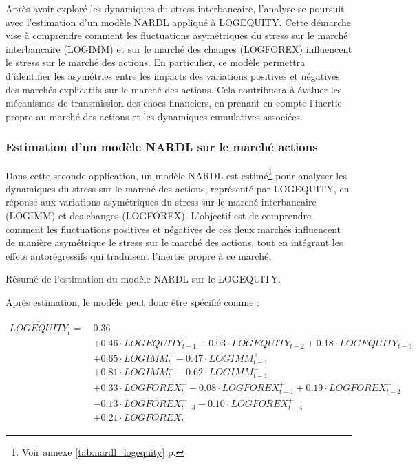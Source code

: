 Après avoir exploré les dynamiques du stress interbancaire, l'analyse se poursuit avec l'estimation d'un modèle NARDL appliqué à LOGEQUITY. Cette démarche vise à comprendre comment les fluctuations asymétriques du stress sur le marché interbancaire (LOGIMM) et sur le marché des changes (LOGFOREX) influencent le stress sur le marché des actions. En particulier, ce modèle permettra d'identifier les asymétries entre les impacts des variations positives et négatives des marchés explicatifs sur le marché des actions. Cela contribuera à évaluer les mécanismes de transmission des chocs financiers, en prenant en compte l'inertie propre au marché des actions et les dynamiques cumulatives associées.

\subsubsection{Estimation d'un modèle NARDL sur le marché actions}

Dans cette seconde application, un modèle NARDL est estimé\footnote{Voir annexe \ref{tab:nardl_logequity} p.\pageref{tab:nardl_logequity}} pour analyser les dynamiques du stress sur le marché des actions, représenté par LOGEQUITY, en réponse aux variations asymétriques du stress sur le marché interbancaire (LOGIMM) et des changes (LOGFOREX). L’objectif est de comprendre comment les fluctuations positives et négatives de ces deux marchés influencent de manière asymétrique le stress sur le marché des actions, tout en intégrant les effets autorégressifs qui traduisent l’inertie propre à ce marché.

\begin{table}[H]
    \centering
    \sffamily
    \caption{Résumé de l'estimation du modèle NARDL sur le LOGEQUITY.}
    \label{tab:estimation_nardl_logequity}
    
\end{table}

Après estimation, le modèle peut donc être spécifié comme : 

\begin{align*}
\widehat{LOGEQUITY}_t =\ & 0.36 \\
& + 0.46 \cdot LOGEQUITY_{t-1} - 0.03 \cdot LOGEQUITY_{t-2} + 0.18 \cdot LOGEQUITY_{t-3} \\
& + 0.65 \cdot LOGIMM^{+}_t - 0.47 \cdot LOGIMM^{+}_{t-1} \\
& + 0.81 \cdot LOGIMM^{-}_t - 0.62 \cdot LOGIMM^{-}_{t-1} \\
& + 0.33 \cdot LOGFOREX^{+}_t - 0.08 \cdot LOGFOREX^{+}_{t-1} + 0.19 \cdot LOGFOREX^{+}_{t-2} \\
& - 0.13 \cdot LOGFOREX^{+}_{t-3} - 0.10 \cdot LOGFOREX^{+}_{t-4} \\
& + 0.21 \cdot LOGFOREX^{-}_t 
\end{align*}

